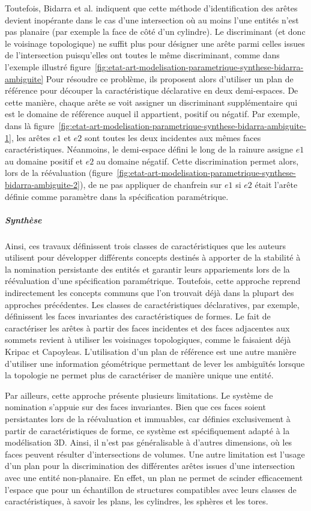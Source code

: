Toutefois, Bidarra et al. indiquent que cette méthode d'identification des
arêtes devient inopérante dans le cas d'une intersection où au moins l'une
entités n'est pas planaire (par exemple la face de côté d'un cylindre). %
Le discriminant (et donc le voisinage topologique) ne suffit plus pour désigner
une arête parmi celles issues de l'intersection puisqu'elles ont toutes le même
discriminant, comme dans l'exemple illustré
figure~\ref{fig:etat-art-modelisation-parametrique-synthese-bidarra-ambiguite} %
Pour résoudre ce problème, ils proposent alors d'utiliser un plan de référence
pour découper la caractéristique déclarative en deux demi-espaces. %
De cette manière, chaque arête se voit assigner un discriminant supplémentaire
qui est le domaine de référence auquel il appartient, positif ou négatif. %
Par exemple, dans là
figure~\ref{fig:etat-art-modelisation-parametrique-synthese-bidarra-ambiguite-1}, les arêtes
\(e1\) et \(e2\) sont toutes les deux incidentes aux mêmes faces
caractéristiques. %
Néanmoins, le demi-espace défini le long de la rainure assigne \(e1\) au domaine
positif et \(e2\) au domaine négatif. %
Cette discrimination permet alors, lors de la réévaluation
(figure~\ref{fig:etat-art-modelisation-parametrique-synthese-bidarra-ambiguite-2}), de ne pas
appliquer de chanfrein sur \(e1\) si \(e2\) était l'arête définie comme
paramètre dans la spécification paramétrique. %


\subparagraph{Synthèse}

Ainsi, ces travaux définissent trois classes de caractéristiques que les auteurs
utilisent pour développer différents concepts destinés à apporter de la
stabilité à la nomination persistante des entités et garantir leurs appariements
lors de la réévaluation d'une spécification paramétrique. %
Toutefois, cette approche reprend indirectement les concepts communs que l'on
trouvait déjà dans la plupart des approches précédentes. %
Les classes de caractéristiques déclaratives, par exemple, définissent les faces
invariantes des caractéristiques de formes. %
Le fait de caractériser les arêtes à partir des faces incidentes et des faces
adjacentes aux sommets revient à utiliser les voisinages topologiques, comme le
faisaient déjà Kripac et Capoyleas. %
L'utilisation d'un plan de référence est une autre manière d'utiliser une
information géométrique permettant de lever les ambiguïtés lorsque la topologie
ne permet plus de caractériser de manière unique une entité. %

Par ailleurs, cette approche présente plusieurs limitations. Le système de nomination s'appuie sur des faces invariantes. Bien que ces faces soient persistantes lors de la réévaluation et immuables, car définies exclusivement à partir de caractéristiques de forme, ce système est spécifiquement adapté à la modélisation 3D. Ainsi, il n'est pas généralisable à d'autres dimensions, où les faces peuvent résulter d'intersections de volumes. Une autre limitation est l'usage d'un plan pour la discrimination des différentes arêtes issues d'une intersection avec une entité non-planaire. %
En effet, un plan ne permet de scinder efficacement l'espace que pour un
échantillon de structures compatibles avec leurs classes de caractéristiques, à
savoir les plans, les cylindres, les sphères et les tores. %


